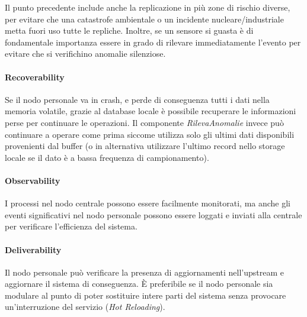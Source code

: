 \documentclass[a4paper,11pt,oneside, table]{article}
\begin{document}
Il punto precedente include anche la replicazione in pi\`u zone di rischio diverse, per evitare che una catastrofe ambientale o un incidente nucleare/industriale metta fuori uso tutte le repliche.
Inoltre, se un sensore si guasta \`e di fondamentale importanza essere in grado di rilevare immediatamente l'evento per evitare che si verifichino anomalie silenziose.

\paragraph{Recoverability}

Se il nodo personale va in crash, e perde di conseguenza tutti i dati nella memoria volatile, grazie al database locale \`e possibile recuperare le informazioni perse per continuare le operazioni. Il componente \textit{RilevaAnomalie} invece pu\`o continuare a operare come prima siccome utilizza solo gli ultimi dati disponibili provenienti dal buffer (o in alternativa utilizzare l'ultimo record nello storage locale se il dato \`e a bassa frequenza di campionamento).

\paragraph{Observability}

I processi nel nodo centrale possono essere facilmente monitorati, ma anche gli eventi significativi nel nodo personale possono essere loggati e inviati alla centrale per verificare l'efficienza del sistema.

\paragraph{Deliverability}

Il nodo personale pu\`o verificare la presenza di aggiornamenti nell'upstream e aggiornare il sistema di conseguenza. \`E preferibile se il nodo personale sia modulare al punto di poter sostituire intere parti del sistema senza provocare un'interruzione del servizio (\textit{Hot Reloading}).
\end{document}
